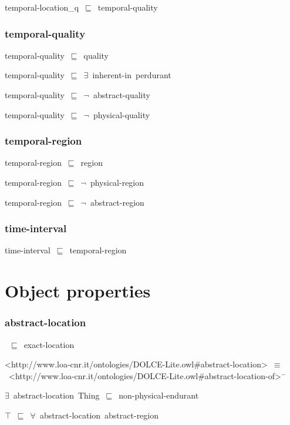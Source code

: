 \documentclass{article}
\begin{document}
temporal-location\_q~\ensuremath{\sqsubseteq}~temporal-quality~

\subsubsection*{temporal-quality}

temporal-quality~\ensuremath{\sqsubseteq}~quality~

temporal-quality~\ensuremath{\sqsubseteq}~\ensuremath{\exists}~inherent-in~perdurant~

temporal-quality~\ensuremath{\sqsubseteq}~\ensuremath{\lnot}~abstract-quality

temporal-quality~\ensuremath{\sqsubseteq}~\ensuremath{\lnot}~physical-quality

\subsubsection*{temporal-region}

temporal-region~\ensuremath{\sqsubseteq}~region~

temporal-region~\ensuremath{\sqsubseteq}~\ensuremath{\lnot}~physical-region

temporal-region~\ensuremath{\sqsubseteq}~\ensuremath{\lnot}~abstract-region

\subsubsection*{time-interval}

time-interval~\ensuremath{\sqsubseteq}~temporal-region~

\section*{Object properties}\subsubsection*{abstract-location}

~\ensuremath{\sqsubseteq}~exact-location

<http://www.loa-cnr.it/ontologies/DOLCE-Lite.owl#abstract-location>~\ensuremath{\equiv}~<http://www.loa-cnr.it/ontologies/DOLCE-Lite.owl#abstract-location-of>\ensuremath{^-}

\ensuremath{\exists}~abstract-location~Thing~\ensuremath{\sqsubseteq}~non-physical-endurant

\ensuremath{\top}~\ensuremath{\sqsubseteq}~\ensuremath{\forall}~abstract-location~abstract-region
\end{document}

